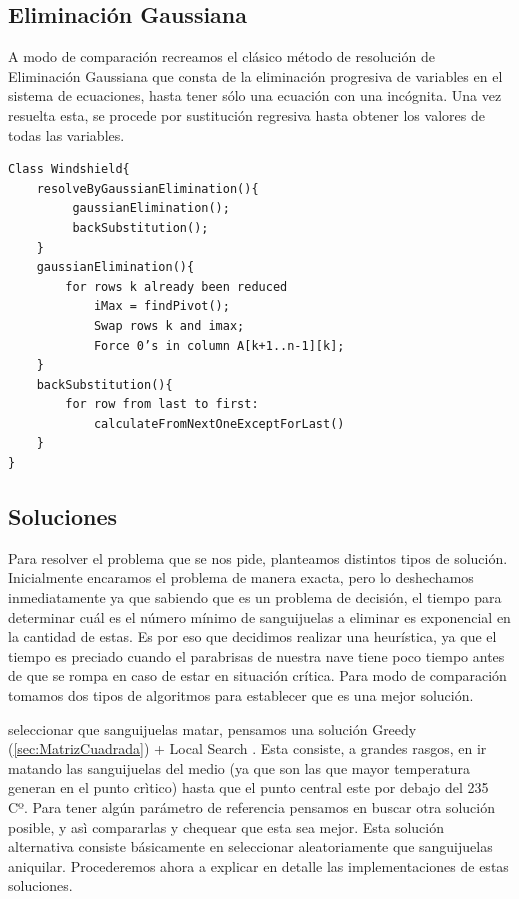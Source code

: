 \newpage

\subsection{Eliminación Gaussiana}
 A modo de comparación recreamos el clásico método de resolución de Eliminación Gaussiana que consta de la eliminación progresiva de variables en el sistema de ecuaciones, hasta tener sólo una ecuación con una incógnita. Una vez resuelta esta, se procede por sustitución regresiva hasta obtener los valores de todas las variables.

\begin{verbatim}
Class Windshield{
    resolveByGaussianElimination(){
         gaussianElimination();
         backSubstitution();
    } 
    gaussianElimination(){
        for rows k already been reduced
            iMax = findPivot();
            Swap rows k and imax;
            Force 0’s in column A[k+1..n-1][k];
    }
    backSubstitution(){
        for row from last to first:
            calculateFromNextOneExceptForLast()
    }
}
\end{verbatim}



\subsection{Soluciones}

Para resolver el problema que se nos pide, planteamos distintos tipos de solución. Inicialmente encaramos el problema de manera exacta, pero lo deshechamos inmediatamente ya que sabiendo que es un problema de decisión, el tiempo para determinar cuál es el número mínimo de sanguijuelas a eliminar es exponencial en la cantidad de estas. Es por eso que decidimos realizar una heurística, ya que el tiempo es preciado cuando el parabrisas de nuestra nave tiene poco tiempo antes de que se rompa en caso de estar en situación crítica. Para modo de comparación tomamos dos tipos de algoritmos para establecer que es una mejor solución.



seleccionar que sanguijuelas matar, pensamos una solución Greedy  (\ref{sec:MatrizCuadrada}) + Local Search . Esta consiste, a grandes rasgos, en ir matando las sanguijuelas del medio (ya que son las que mayor temperatura generan en el punto crìtico) hasta que el punto central este por debajo del 235 Cº. Para tener algún parámetro de referencia pensamos en buscar otra solución posible, y asì  compararlas y chequear que esta sea mejor. Esta solución alternativa consiste básicamente en seleccionar aleatoriamente que sanguijuelas aniquilar. Procederemos ahora a explicar en detalle las implementaciones de estas soluciones.

